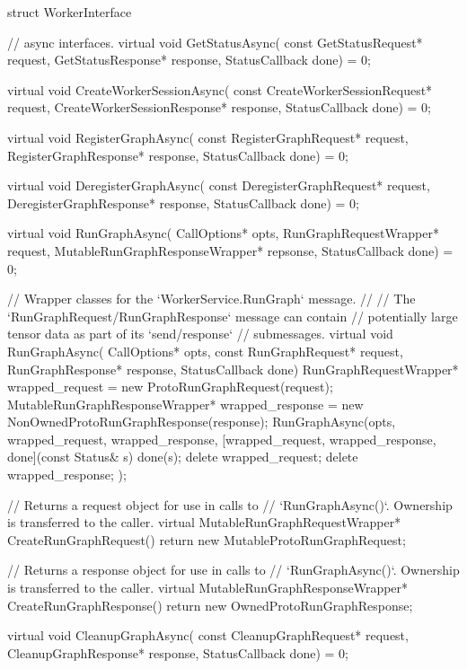 \begin{content}
\begin{content}
\begin{content}
\begin{leftbar}
\begin{c++}
struct WorkerInterface {
  // async interfaces.
  virtual void GetStatusAsync(
      const GetStatusRequest* request,
      GetStatusResponse* response,
      StatusCallback done) = 0;

  virtual void CreateWorkerSessionAsync(
      const CreateWorkerSessionRequest* request,
      CreateWorkerSessionResponse* response, 
      StatusCallback done) = 0;

  virtual void RegisterGraphAsync(
      const RegisterGraphRequest* request,
      RegisterGraphResponse* response,
      StatusCallback done) = 0;

  virtual void DeregisterGraphAsync(
      const DeregisterGraphRequest* request,
      DeregisterGraphResponse* response,
      StatusCallback done) = 0;

  virtual void RunGraphAsync(
      CallOptions* opts, 
      RunGraphRequestWrapper* request,
      MutableRunGraphResponseWrapper* repsonse,
      StatusCallback done) = 0;

  // Wrapper classes for the `WorkerService.RunGraph` message.
  //
  // The `RunGraphRequest/RunGraphResponse` message can contain 
  // potentially large tensor data as part of its `send/response`
  // submessages.
  virtual void RunGraphAsync(
      CallOptions* opts, 
      const RunGraphRequest* request,
      RunGraphResponse* response, 
      StatusCallback done) {
    RunGraphRequestWrapper* wrapped_request = 
        new ProtoRunGraphRequest(request);
    MutableRunGraphResponseWrapper* wrapped_response =
        new NonOwnedProtoRunGraphResponse(response);
    RunGraphAsync(opts, wrapped_request, wrapped_response,
        [wrapped_request, wrapped_response, done](const Status& s) {
            done(s);
            delete wrapped_request;
            delete wrapped_response;
        });
  }

  // Returns a request object for use in calls to
  // `RunGraphAsync()`. Ownership is transferred to the caller.
  virtual MutableRunGraphRequestWrapper* CreateRunGraphRequest() {
    return new MutableProtoRunGraphRequest;
  }

  // Returns a response object for use in calls to
  // `RunGraphAsync()`. Ownership is transferred to the caller.
  virtual MutableRunGraphResponseWrapper* CreateRunGraphResponse() {
    return new OwnedProtoRunGraphResponse;
  }

  virtual void CleanupGraphAsync(
      const CleanupGraphRequest* request,
      CleanupGraphResponse* response,
      StatusCallback done) = 0;

}
\end{c++}
\end{leftbar}
\end{content}
\end{content}
\end{content}
